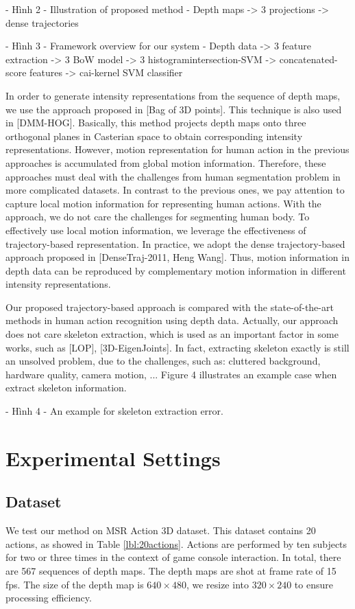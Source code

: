 \documentclass[review]{elsarticle}
\begin{document}
- Hình 2 - Illustration of proposed method - Depth maps -> 3 projections -> dense trajectories

- Hình 3 - Framework overview for our system - Depth data -> 3 feature extraction -> 3 BoW model -> 3 histogramintersection-SVM -> concatenated-score features -> cai-kernel SVM classifier

In order to generate intensity representations from the sequence of depth maps, we use the approach proposed in [Bag of 3D points]. This technique is also used in [DMM-HOG]. Basically, this method projects depth maps onto three orthogonal planes in Casterian space to obtain corresponding intensity representations. However, motion representation for human action in the previous approaches is accumulated from global motion information. Therefore, these approaches must deal with the challenges from human segmentation problem in more complicated datasets. In contrast to the previous ones, we pay attention to capture local motion information for representing human actions. With the approach, we do not care the challenges for segmenting human body. To effectively use local motion information, we leverage the effectiveness of trajectory-based representation. In practice, we adopt the dense trajectory-based approach proposed in [DenseTraj-2011, Heng Wang]. Thus, motion information in depth data can be reproduced by complementary motion information in different intensity representations.

Our proposed trajectory-based approach is compared with the state-of-the-art methods in human action recognition using depth data. Actually, our approach does not care skeleton extraction, which is used as an important factor in some works, such as [LOP], [3D-EigenJoints]. In fact, extracting skeleton exactly is still an unsolved problem, due to the challenges, such as: cluttered background, hardware quality, camera motion, ... Figure 4 illustrates an example case when extract skeleton information.

- Hình 4 - An example for skeleton extraction error.

\section{Experimental Settings}

\subsection{Dataset}
We test our method on MSR Action 3D dataset. This dataset contains 20 actions, as showed in Table \ref{lbl:20actions}. Actions are performed by ten subjects for two or three times in the context of game console interaction. In total, there are 567 sequences of depth maps. The depth maps are shot at frame rate of 15 fps. The size of the depth map is $640 \times 480$, we resize into $320 \times 240$ to ensure processing efficiency.
\end{document}
